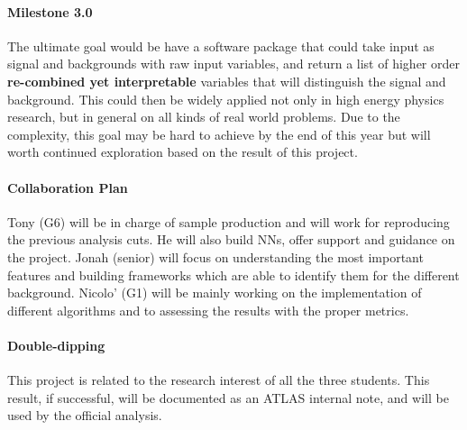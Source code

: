 \documentclass[11pt]{article}
\begin{document}
\paragraph{Milestone 3.0}
The ultimate goal would be have a software package that could take input as signal and backgrounds with raw input variables, and return a list of higher order \textbf{re-combined yet interpretable} variables that will distinguish the signal and background. This could then be widely applied not only in high energy physics research, but in general on all kinds of real world problems. Due to the complexity, this goal may be hard to achieve by the end of this year but will worth continued exploration based on the result of this project.

\paragraph{Collaboration Plan}
Tony (G6) will be in charge of sample production and will work for reproducing the previous analysis cuts. He will also build NNs, offer support and guidance on the project. 
Jonah (senior) will focus on understanding the most important features and building frameworks which are able to identify them for the different background.
Nicolo' (G1) will be mainly working on the implementation of different algorithms and to assessing the results with the proper metrics.

\paragraph{Double-dipping}
This project is related to the research interest of all the three students. This result, if successful, will be documented as an ATLAS internal note, and will be used by the official analysis.
\end{document}
